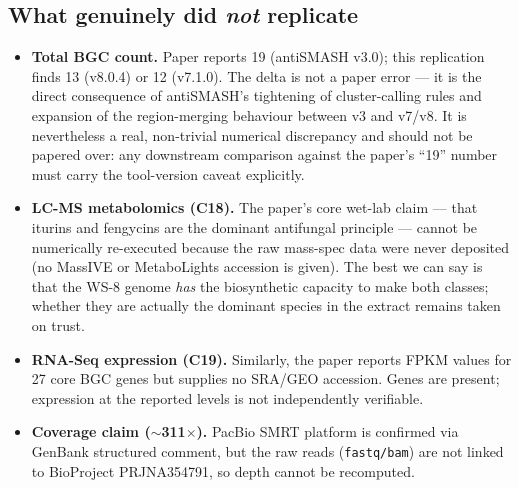 \documentclass[11pt]{article}
\begin{document}
\subsection{What genuinely did \emph{not} replicate}
\begin{itemize}
\item \textbf{Total BGC count.} Paper reports 19 (antiSMASH v3.0); this replication finds 13 (v8.0.4) or 12 (v7.1.0). The delta is not a paper error --- it is the direct consequence of antiSMASH's tightening of cluster-calling rules and expansion of the region-merging behaviour between v3 and v7/v8. It is nevertheless a real, non-trivial numerical discrepancy and should not be papered over: any downstream comparison against the paper's ``19'' number must carry the tool-version caveat explicitly.
\item \textbf{LC-MS metabolomics (C18).} The paper's core wet-lab claim --- that iturins and fengycins are the dominant antifungal principle --- cannot be numerically re-executed because the raw mass-spec data were never deposited (no MassIVE or MetaboLights accession is given). The best we can say is that the WS-8 genome \emph{has} the biosynthetic capacity to make both classes; whether they are actually the dominant species in the extract remains taken on trust.
\item \textbf{RNA-Seq expression (C19).} Similarly, the paper reports FPKM values for 27 core BGC genes but supplies no SRA/GEO accession. Genes are present; expression at the reported levels is not independently verifiable.
\item \textbf{Coverage claim ($\sim$311$\times$).} PacBio SMRT platform is confirmed via GenBank structured comment, but the raw reads (\texttt{fastq/bam}) are not linked to BioProject PRJNA354791, so depth cannot be recomputed.
\end{itemize}
\end{document}
